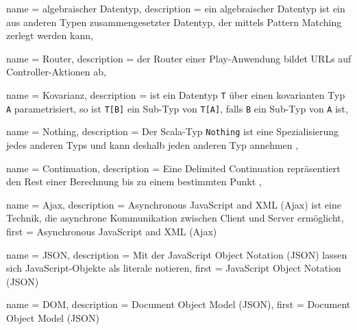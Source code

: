 






{
  name        = algebraischer Datentyp,
  description = {ein algebraischer Datentyp ist ein aus anderen Typen zusammengesetzter Datentyp, der mittels Pattern Matching zerlegt werden kann},
}


{
  name        = Router,
  description = {der Router einer Play-Anwendung bildet URLs auf Controller-Aktionen ab},
}


{
  name        = Kovarianz,
  description = {ist ein Datentyp \lstinline|T| über einen kovarianten Typ \lstinline|A| parametrisiert, so ist \lstinline|T[B]| ein Sub-Typ von \lstinline|T[A]|, falls \lstinline|B| ein Sub-Typ von \lstinline|A| ist},
}


{
  name        = Nothing,
  description = {Der Scala-Typ \lstinline|Nothing| ist eine Spezialisierung jedes anderen Typs und kann deshalb jeden anderen Typ annehmen \cite[vgl.][S.~216]{programming_in_scala}},
}


{
  name        = Continuation,
  description = {Eine Delimited Continuation repräsentiert den Rest einer Berechnung bis zu einem bestimmten Punkt \cite[vgl.][S.~1]{continuations}},
}


{
  name        = Ajax,
  description = {Asynchronous JavaScript and XML (Ajax) ist eine Technik, die asynchrone Kommunikation zwischen Client und Server ermöglicht},
  first       = {Asynchronous JavaScript and XML (Ajax)}
}


{
  name        = JSON,
  description = {Mit der JavaScript Object Notation (JSON) lassen sich JavaScript-Objekte als literale notieren},
  first       = {JavaScript Object Notation (JSON)}
}


{
  name        = DOM,
  description = {Document Object Model (JSON)},
  first       = {Document Object Model (JSON)}
}